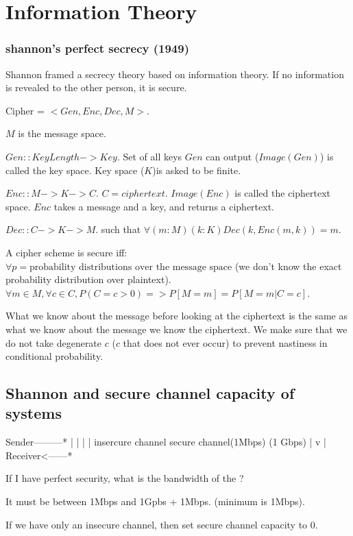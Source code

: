 \chapter{Information Theory}

\subsection{shannon's perfect secrecy (1949)}
Shannon framed a secrecy theory based on information theory. If no
information is revealed to the other person, it is secure.

Cipher = $<Gen, Enc, Dec, M>$.

$M$ is the message space.

$Gen :: KeyLength -> Key$. Set of all keys $Gen$ can output
($Image(Gen)$) is called the key space. Key space ($K$)is asked to be finite.


$Enc :: M -> K -> C$. $C = ciphertext$. $Image(Enc)$ is called the ciphertext space.
$Enc$ takes a message and a key, and returns a ciphertext.

$Dec :: C -> K -> M$. such that $\forall (m: M) (k: K) Dec(k, Enc (m, k)) = m$.


A cipher scheme is secure iff: $\forall p = \text{probability distributions over the message space}$
(we don't know the exact probability distribution over
plaintext).
$\forall m \in M, \forall c \in C, P(C = c > 0) => P[M=m] = P[M=m | C=c]$.

What we know about the message before looking at the
ciphertext is the same as what we know about the message  we know the ciphertext.
We make sure that we do not take degenerate $c$ ($c$ that does not ever occur) to prevent nastiness in
conditional probability.

\section{Shannon and secure channel capacity of systems}

        Sender---------*
        |              |
        |              |
 insercure channel secure channel(1Mbps)
     (1 Gbps)          |
        v              |
        Receiver<------*

If I have perfect security, what is the bandwidth of the ?

It must be between 1Mbps and 1Gpbs + 1Mbps. (minimum is 1Mbps).

If we have only an insecure channel, then set secure channel capacity to 0.

